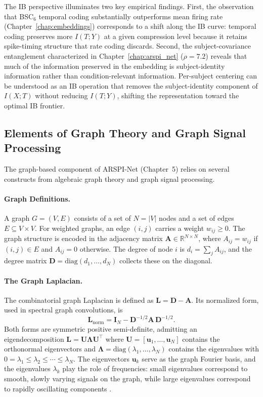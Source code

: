 The IB perspective illuminates two key empirical findings. First, the observation that BSC$_6$ temporal coding substantially outperforms mean firing rate (Chapter~\ref{chap:embeddings}) corresponds to a shift along the IB curve: temporal coding preserves more $I(T; Y)$ at a given compression level because it retains spike-timing structure that rate coding discards. Second, the subject-covariance entanglement characterized in Chapter~\ref{chap:arspi_net} ($\rho = 7.2$) reveals that much of the information preserved in the embedding is subject-identity information rather than condition-relevant information. Per-subject centering can be understood as an IB operation that removes the subject-identity component of $I(X; T)$ without reducing $I(T; Y)$, shifting the representation toward the optimal IB frontier.

\subsection{Elements of Graph Theory and Graph Signal Processing}
\label{sec:graph_theory}

The graph-based component of ARSPI-Net (Chapter~5) relies on several constructs from algebraic graph theory and graph signal processing.

\paragraph{Graph Definitions.}
A graph $G = (V, E)$ consists of a set of $N = |V|$ nodes and a set of edges $E \subseteq V \times V$. For weighted graphs, an edge $(i,j)$ carries a weight $w_{ij} \geq 0$. The graph structure is encoded in the adjacency matrix $\mathbf{A} \in \mathbb{R}^{N \times N}$, where $A_{ij} = w_{ij}$ if $(i,j) \in E$ and $A_{ij} = 0$ otherwise. The degree of node $i$ is $d_i = \sum_j A_{ij}$, and the degree matrix $\mathbf{D} = \text{diag}(d_1, \ldots, d_N)$ collects these on the diagonal.

\paragraph{The Graph Laplacian.}
The combinatorial graph Laplacian is defined as $\mathbf{L} = \mathbf{D} - \mathbf{A}$. Its normalized form, used in spectral graph convolutions, is
\begin{equation}
    \mathbf{L}_{\text{norm}} = \mathbf{I}_N - \mathbf{D}^{-1/2} \mathbf{A}\, \mathbf{D}^{-1/2}.
    \label{eq:normalized_laplacian}
\end{equation}
Both forms are symmetric positive semi-definite, admitting an eigendecomposition $\mathbf{L} = \mathbf{U} \boldsymbol{\Lambda} \mathbf{U}^\top$ where $\mathbf{U} = [\mathbf{u}_1, \ldots, \mathbf{u}_N]$ contains the orthonormal eigenvectors and $\boldsymbol{\Lambda} = \text{diag}(\lambda_1, \ldots, \lambda_N)$ contains the eigenvalues with $0 = \lambda_1 \leq \lambda_2 \leq \cdots \leq \lambda_N$. The eigenvectors $\mathbf{u}_k$ serve as the graph Fourier basis, and the eigenvalues $\lambda_k$ play the role of frequencies: small eigenvalues correspond to smooth, slowly varying signals on the graph, while large eigenvalues correspond to rapidly oscillating components \cite{shuman_emerging_2013}.

